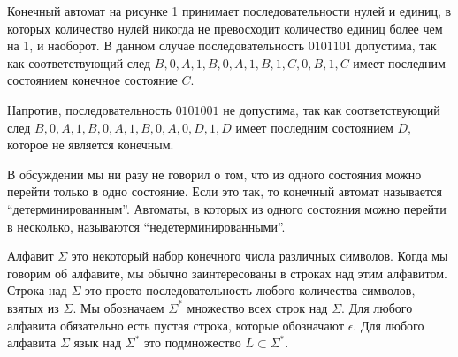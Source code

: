 

Конечный автомат на рисунке 1 принимает последовательности нулей и единиц, в которых количество нулей никогда не превосходит количество единиц более чем на 1, и наоборот. В данном случае последовательность $0101101$ допустима, так как соответствующий след $B, 0, A, 1, B, 0, A, 1, B, 1, C, 0, B, 1, C$ 
имеет последним состоянием конечное состояние $C$. 

Напротив, последовательность $0101001$ не допустима, так как соответствующий след $B, 0, A, 1, B, 0, A, 1, B, 0, A, 0, D, 1, D$ имеет последним состоянием $D$, которое не является конечным.


В обсуждении мы ни разу не говорил о том, что из одного состояния можно перейти только в одно состояние. Если это так, то конечный автомат называется ``детерминированным''. Автоматы, в которых из одного состояния можно перейти в несколько, называются ``недетерминированными''.



Алфавит $\Sigma$ это некоторый набор конечного числа различных символов. Когда мы говорим об алфавите, мы обычно заинтересованы в строках над этим алфавитом. Строка над $\Sigma$ это просто последовательность любого количества символов, взятых из $\Sigma$. Мы обозначаем $\Sigma^*$ множество всех строк над $\Sigma$. Для любого алфавита обязательно есть пустая строка, которые обозначают $\epsilon$. Для любого алфавита $\Sigma$ язык над $\Sigma^*$ это подмножество $L \subset \Sigma^*$.

\label{def-dfsm}

